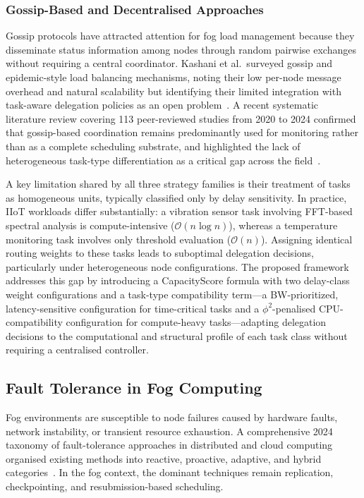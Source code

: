 \documentclass[conference]{IEEEtran}
\begin{document}
\subsubsection{Gossip-Based and Decentralised Approaches}

Gossip protocols have attracted attention for fog load management because they disseminate status information among nodes through random pairwise exchanges without requiring a central coordinator. Kashani et al.\ surveyed gossip and epidemic-style load balancing mechanisms, noting their low per-node message overhead and natural scalability but identifying their limited integration with task-aware delegation policies as an open problem~\cite{kashani2020}. A recent systematic literature review covering 113 peer-reviewed studies from 2020 to 2024 confirmed that gossip-based coordination remains predominantly used for monitoring rather than as a complete scheduling substrate, and highlighted the lack of heterogeneous task-type differentiation as a critical gap across the field~\cite{vijarania2025}.

A key limitation shared by all three strategy families is their treatment of tasks as homogeneous units, typically classified only by delay sensitivity. In practice, IIoT workloads differ substantially: a vibration sensor task involving FFT-based spectral analysis is compute-intensive ($\mathcal{O}(n \log n)$), whereas a temperature monitoring task involves only threshold evaluation ($\mathcal{O}(n)$). Assigning identical routing weights to these tasks leads to suboptimal delegation decisions, particularly under heterogeneous node configurations. The proposed framework addresses this gap by introducing a CapacityScore formula with two delay-class weight configurations and a task-type compatibility term---a BW-prioritized, latency-sensitive configuration for time-critical tasks and a $\phi^2$-penalised CPU-compatibility configuration for compute-heavy tasks---adapting delegation decisions to the computational and structural profile of each task class without requiring a centralised controller.

\subsection{Fault Tolerance in Fog Computing}

Fog environments are susceptible to node failures caused by hardware faults, network instability, or transient resource exhaustion. A comprehensive 2024 taxonomy of fault-tolerance approaches in distributed and cloud computing organised existing methods into reactive, proactive, adaptive, and hybrid categories~\cite{kirti2024}. In the fog context, the dominant techniques remain replication, checkpointing, and resubmission-based scheduling.
\end{document}
